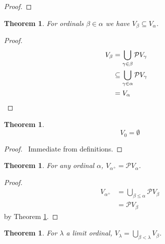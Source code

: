 \documentclass{article}
\let\qed\relax
\newtheorem{theorem}[axiom]{Theorem}
\theoremstyle{definition}
\begin{document}
    \begin{proof}
        \pf
        \qed
    \end{proof}

    \begin{theorem}
        \label{theorem:V_cumulative}
        For ordinals $\beta \in \alpha$ we have $V_\beta \subseteq V_\alpha$.
    \end{theorem}

    \begin{proof}
        \pf
        \begin{align*}
            V_\beta & = \bigcup_{\gamma \in \beta} \mathcal{P} V_\gamma \\
            & \subseteq \bigcup_{\gamma \in \alpha} \mathcal{P} V_\gamma \\
            & = V_\alpha & \qed
        \end{align*}
    \end{proof}

    \begin{theorem}
        \[ V_0 = \emptyset \]
    \end{theorem}

    \begin{proof}
        \pf\ Immediate from definitions. \qed
    \end{proof}

    \begin{theorem}
        For any ordinal $\alpha$, $V_{\alpha^+} = \mathcal{P} V_\alpha$.
    \end{theorem}

    \begin{proof}
        \pf
        \begin{align*}
            V_{\alpha^+} & = \bigcup_{\beta \leq \alpha} \mathcal{P} V_\beta \\
            & = \mathcal{P} V_\beta
        \end{align*}
        by Theorem \ref{theorem:V_cumulative}.
        \qed
    \end{proof}

    \begin{theorem}
        For $\lambda$ a limit ordinal, $V_\lambda = \bigcup_{\beta < \lambda} V_\beta$.
    \end{theorem}
\end{document}
